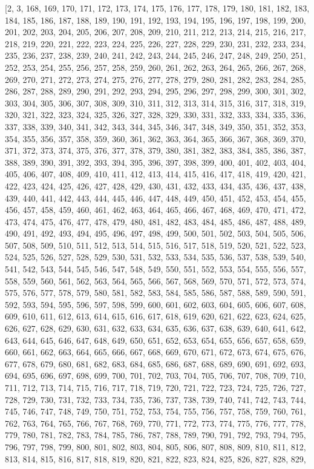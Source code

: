 \documentclass[11pt]{article}
\begin{document}
\begin{itemize}
[2, 3, 168, 169, 170, 171, 172, 173, 174, 175, 176, 177, 178, 179, 180, 181, 182, 183, 184, 185, 186, 187, 188, 189, 190, 191, 192, 193, 194, 195, 196, 197, 198, 199, 200, 201, 202, 203, 204, 205, 206, 207, 208, 209, 210, 211, 212, 213, 214, 215, 216, 217, 218, 219, 220, 221, 222, 223, 224, 225, 226, 227, 228, 229, 230, 231, 232, 233, 234, 235, 236, 237, 238, 239, 240, 241, 242, 243, 244, 245, 246, 247, 248, 249, 250, 251, 252, 253, 254, 255, 256, 257, 258, 259, 260, 261, 262, 263, 264, 265, 266, 267, 268, 269, 270, 271, 272, 273, 274, 275, 276, 277, 278, 279, 280, 281, 282, 283, 284, 285, 286, 287, 288, 289, 290, 291, 292, 293, 294, 295, 296, 297, 298, 299, 300, 301, 302, 303, 304, 305, 306, 307, 308, 309, 310, 311, 312, 313, 314, 315, 316, 317, 318, 319, 320, 321, 322, 323, 324, 325, 326, 327, 328, 329, 330, 331, 332, 333, 334, 335, 336, 337, 338, 339, 340, 341, 342, 343, 344, 345, 346, 347, 348, 349, 350, 351, 352, 353, 354, 355, 356, 357, 358, 359, 360, 361, 362, 363, 364, 365, 366, 367, 368, 369, 370, 371, 372, 373, 374, 375, 376, 377, 378, 379, 380, 381, 382, 383, 384, 385, 386, 387, 388, 389, 390, 391, 392, 393, 394, 395, 396, 397, 398, 399, 400, 401, 402, 403, 404, 405, 406, 407, 408, 409, 410, 411, 412, 413, 414, 415, 416, 417, 418, 419, 420, 421, 422, 423, 424, 425, 426, 427, 428, 429, 430, 431, 432, 433, 434, 435, 436, 437, 438, 439, 440, 441, 442, 443, 444, 445, 446, 447, 448, 449, 450, 451, 452, 453, 454, 455, 456, 457, 458, 459, 460, 461, 462, 463, 464, 465, 466, 467, 468, 469, 470, 471, 472, 473, 474, 475, 476, 477, 478, 479, 480, 481, 482, 483, 484, 485, 486, 487, 488, 489, 490, 491, 492, 493, 494, 495, 496, 497, 498, 499, 500, 501, 502, 503, 504, 505, 506, 507, 508, 509, 510, 511, 512, 513, 514, 515, 516, 517, 518, 519, 520, 521, 522, 523, 524, 525, 526, 527, 528, 529, 530, 531, 532, 533, 534, 535, 536, 537, 538, 539, 540, 541, 542, 543, 544, 545, 546, 547, 548, 549, 550, 551, 552, 553, 554, 555, 556, 557, 558, 559, 560, 561, 562, 563, 564, 565, 566, 567, 568, 569, 570, 571, 572, 573, 574, 575, 576, 577, 578, 579, 580, 581, 582, 583, 584, 585, 586, 587, 588, 589, 590, 591, 592, 593, 594, 595, 596, 597, 598, 599, 600, 601, 602, 603, 604, 605, 606, 607, 608, 609, 610, 611, 612, 613, 614, 615, 616, 617, 618, 619, 620, 621, 622, 623, 624, 625, 626, 627, 628, 629, 630, 631, 632, 633, 634, 635, 636, 637, 638, 639, 640, 641, 642, 643, 644, 645, 646, 647, 648, 649, 650, 651, 652, 653, 654, 655, 656, 657, 658, 659, 660, 661, 662, 663, 664, 665, 666, 667, 668, 669, 670, 671, 672, 673, 674, 675, 676, 677, 678, 679, 680, 681, 682, 683, 684, 685, 686, 687, 688, 689, 690, 691, 692, 693, 694, 695, 696, 697, 698, 699, 700, 701, 702, 703, 704, 705, 706, 707, 708, 709, 710, 711, 712, 713, 714, 715, 716, 717, 718, 719, 720, 721, 722, 723, 724, 725, 726, 727, 728, 729, 730, 731, 732, 733, 734, 735, 736, 737, 738, 739, 740, 741, 742, 743, 744, 745, 746, 747, 748, 749, 750, 751, 752, 753, 754, 755, 756, 757, 758, 759, 760, 761, 762, 763, 764, 765, 766, 767, 768, 769, 770, 771, 772, 773, 774, 775, 776, 777, 778, 779, 780, 781, 782, 783, 784, 785, 786, 787, 788, 789, 790, 791, 792, 793, 794, 795, 796, 797, 798, 799, 800, 801, 802, 803, 804, 805, 806, 807, 808, 809, 810, 811, 812, 813, 814, 815, 816, 817, 818, 819, 820, 821, 822, 823, 824, 825, 826, 827, 828, 829, 
\end{itemize}
\end{document}
